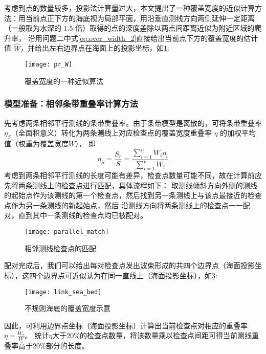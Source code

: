 \documentclass[withoutpreface,bwprint]{cumcmthesis} %
\begin{document}
        考虑到点的数量较多，投影法计算量过大，本文提出了一种覆盖宽度的近似计算方法：用当前点正下方的海底视为局部平面，用沿垂直测线方向两侧延伸一定距离（一般取为水深的 $1.5$ 倍）取得的点的深度差除以两点间距离近似为附近区域的爬升率，
        沿用问题二中式\cref{eq:over_width_2}直接给出当前点下方的覆盖宽度的估计值 $\hat{W}$，并给出左右边界点在海面上的投影坐标，如\cref{fig:pr_W}:
        \begin{figure}[H]
            \centering
            \texttt{[image: pr\_W]}
            \caption{覆盖宽度的一种近似算法}
            \label{fig:pr_W}
        \end{figure}

        \subsubsection{模型准备：相邻条带重叠率计算方法}
        先考虑两条相邻平行测线的条带重叠率。由于条带模型是离散的，可将条带重叠率 $\eta_S$（全面积意义）转化为两条测线上对应检查点的覆盖宽度重叠率 $\eta$ 的加权平均值（权重为覆盖宽度$W$），
        即
        \begin{equation}
            \eta_S =\frac{S_r}{S} = \frac{\sum\limits_{i=1}^n W_i\eta_i}{\sum\limits_{i=1}^n W_i}
            \label{eq:eta_S}
        \end{equation}
        考虑到两条相邻平行测线的长度可能有差异，检查点数量可能不同，故在计算前应先将两条测线上的检查点进行匹配，具体流程如下：
        取测线倾斜方向外侧的测线的起始点作为该测线的第一个检查点，然后找到另一条测线上与该点最接近的检查点作为另一条测线的新起始点，然后
        沿测线方向将两条测线上的检查点一一配对，直到其中一条测线的检查点均已被配对。
        \begin{figure}[H]
            \centering
            \texttt{[image: parallel\_match]}
            \caption{相邻测线检查点的匹配}
            \label{fig:parallel_match}
        \end{figure}

        
        配对完成后，我们可以给出每对检查点发出波束形成的共四个边界点（海面投影坐标），这四个边界点可近似认为在同一直线上（海面投影坐标），如\cref{fig:link_sea_bed}:
        \begin{figure}[H]
            \centering
            \texttt{[image: link\_sea\_bed]}
            \caption{不规则海底的覆盖宽度示意}
            \label{fig:link_sea_bed}
        \end{figure}
        因此，可利用边界点坐标（海面投影坐标）计算出当前检查点对相应的重叠率 $\eta = \frac{W_r}{W}$。
        统计$\eta$大于$20\%$的检查点数量，将该数量乘以检查点间距可得当前测线重叠率高于$20\%$部分的长度。
\end{document}
